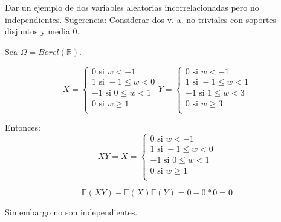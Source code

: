 \begin{problem}[5]Dar un ejemplo de dos variables aleatorias incorrelacionadas pero no independientes.
Sugerencia: Considerar dos v. a. no triviales con soportes disjuntos y media 0.


\solution

Sea $\Omega = Borel(\mathbb{R})$.

$$
X =
  \left\lbrace
  \begin{array}{l}
      0 \text{ si } w < -1\\
      1 \text{ si } -1 \leq w < 0\\
      -1 \text{ si } 0 \leq w < 1\\
      0 \text{ si } w \geq 1\\
  \end{array}
  \right.
Y =
  \left\lbrace
  \begin{array}{l}
      0 \text{ si } w < -1\\
      1 \text{ si } -1 \leq w < 1\\
      -1 \text{ si } 1 \leq w < 3\\
      0 \text{ si } w \geq 3\\
  \end{array}
  \right.
$$

Entonces:
$$
XY = X =
  \left\lbrace
  \begin{array}{l}
  	  0 \text{ si } w < -1\\
  	  1 \text{ si } -1 \leq w < 0\\
  	  -1 \text{ si } 0 \leq w < 1\\
  	  0 \text{ si } w \geq 1\\
  \end{array}
  \right.
$$

\[
\mathbb{E}(XY)-\mathbb{E}(X)\mathbb{E}(Y) = 0 - 0*0 = 0
\]

Sin embargo no son independientes.



\end{problem}


